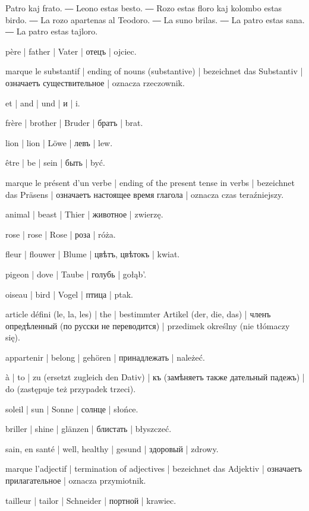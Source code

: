 
Patro kaj frato. ― Leono estas besto. ― Rozo estas floro kaj kolombo estas birdo. ― La rozo apartenas al Teodoro. ― La suno brilas. ― La patro estas sana. ― La patro estas tajloro.

\begin{ekzvocab}{1em}
 père | father | Vater | отецъ | ojciec.

 marque le substantif | ending of nouns (substantive) | bezeichnet das Substantiv | означаетъ существительное | oznacza rzeczownik.

 et | and | und | и | i.

 frère | brother | Bruder | братъ | brat.

 lion | lion | Löwe | левъ | lew.

 être | be | sein | быть | być.

 marque le présent d’un verbe | ending of the present tense in verbs | bezeichnet das Präsens | означаетъ настоящее время глагола | oznacza czas teraźniejszy.

 animal | beast | Thier | животное | zwierzę.

 rose | rose | Rose | роза | róża.

 fleur | flouwer | Blume | цвѣтъ, цвѣтокъ | kwiat.

 pigeon | dove | Taube | голубь | gołąb’.

 oiseau | bird | Vogel | птица | ptak.

 article défini (le, la, les) | the | bestimmter Artikel (der, die, das) | членъ опредѣленный (по русски не переводится) | przedimek określny (nie tłómaczy się).

 appartenir | belong | gehören | принадлежать | należeć.

 à | to | zu (ersetzt zugleich den Dativ) | къ (замѣняетъ также дательный падежъ) | do (zastępuje też przypadek trzeci).

 soleil | sun | Sonne | солнце | słońce.

 briller | shine | glänzen | блистать | błyszczeć.

 sain, en santé | well, healthy | gesund | здоровый | zdrowy.

 marque l’adjectif | termination of adjectives | bezeichnet das Adjektiv | означаетъ прилагательное | oznacza przymiotnik.

 tailleur | tailor | Schneider | портной | krawiec.

\end{ekzvocab}


